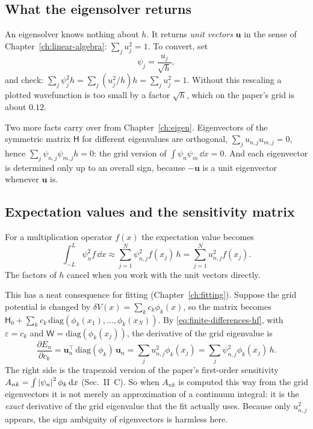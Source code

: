 \subsection{What the eigensolver returns}

An eigensolver knows nothing about $h$. It returns \emph{unit vectors} $\mathbf u$ in the sense of Chapter~\ref{ch:linear-algebra}: $\sum_ju_j^2=1$. To convert, set
\begin{equation}
\psi_j=\frac{u_j}{\sqrt h},
\label{eq:finite-differences-rescale}
\end{equation}
and check: $\sum_j\psi_j^2h=\sum_j(u_j^2/h)h=\sum_ju_j^2=1$. Without this rescaling a plotted wavefunction is too small by a factor $\sqrt h$, which on the paper's grid is about $0.12$.

Two more facts carry over from Chapter~\ref{ch:eigen}. Eigenvectors of the symmetric matrix $\mathsf H$ for different eigenvalues are orthogonal, $\sum_ju_{n,j}u_{m,j}=0$, hence $\sum_j\psi_{n,j}\psi_{m,j}h=0$: the grid version of $\int\psi_n\psi_m\,\dd x=0$. And each eigenvector is determined only up to an overall sign, because $-\mathbf u$ is a unit eigenvector whenever $\mathbf u$ is.

\subsection{Expectation values and the sensitivity matrix}

For a multiplication operator $f(x)$ the expectation value becomes
\begin{equation}
\int_{-L}^{L}\psi_n^2f\,\dd x\approx\sum_{j=1}^{N}\psi_{n,j}^2f(x_j)\,h=\sum_{j=1}^{N}u_{n,j}^2f(x_j).
\label{eq:finite-differences-expect}
\end{equation}
The factors of $h$ cancel when you work with the unit vectors directly.

This has a neat consequence for fitting (Chapter~\ref{ch:fitting}). Suppose the grid potential is changed by $\delta V(x)=\sum_kc_k\phi_k(x)$, so the matrix becomes $\mathsf H_0+\sum_kc_k\,\mathrm{diag}(\phi_k(x_1),\dots,\phi_k(x_N))$. By \eqref{eq:finite-differences-hf}, with $\varepsilon=c_k$ and $\mathsf W=\mathrm{diag}(\phi_k(x_j))$, the derivative of the grid eigenvalue is
\begin{equation}
\frac{\partial E_n}{\partial c_k}=\mathbf u_n^\top\,\mathrm{diag}(\phi_k)\,\mathbf u_n=\sum_ju_{n,j}^2\phi_k(x_j)=\sum_j\psi_{n,j}^2\phi_k(x_j)\,h.
\label{eq:finite-differences-Ank}
\end{equation}
The right side is the trapezoid version of the paper's first-order sensitivity $A_{nk}=\int\left\lvert \psi_n\right\rvert^2\phi_k\,\mathrm{d} x$ (Sec.~II~C). So when $A_{nk}$ is computed this way from the grid eigenvectors it is not merely an approximation of a continuum integral: it is the \emph{exact} derivative of the grid eigenvalue that the fit actually uses. Because only $u_{n,j}^2$ appears, the sign ambiguity of eigenvectors is harmless here.


